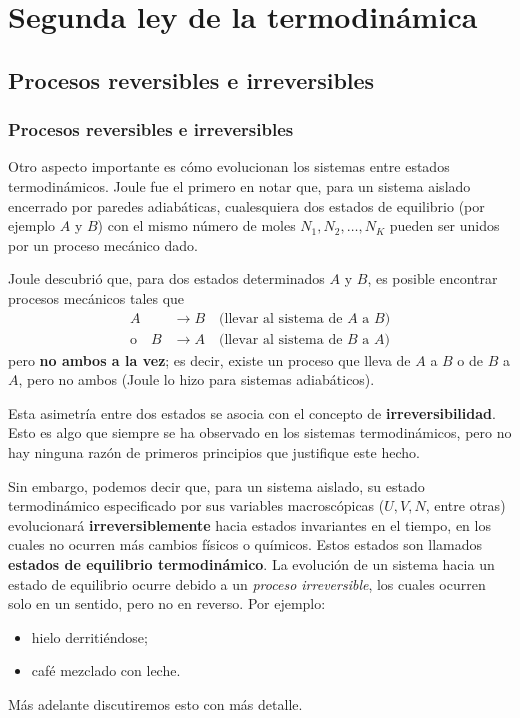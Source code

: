 \chapter{Segunda ley de la termodinámica}

\section{Procesos reversibles e irreversibles}

\subsection*{Procesos reversibles e irreversibles}

Otro aspecto importante es cómo evolucionan los sistemas entre estados termodinámicos. Joule fue
el primero en notar que, para un sistema aislado encerrado por paredes adiabáticas, cualesquiera
dos estados de equilibrio (por ejemplo $A$ y $B$) con el mismo número de moles $N_1,N_2,\dots,N_K$
pueden ser unidos por un proceso mecánico dado.

Joule descubrió que, para dos estados determinados $A$ y $B$, es posible encontrar procesos
mecánicos tales que
\begin{align*}
  A&\to B\quad\text{(llevar al sistema de $A$ a $B$)}\\
  \text{o}\quad B&\to A\quad\text{(llevar al sistema de $B$ a $A$)}
\end{align*}
pero \textbf{no ambos a la vez}; es decir, existe un proceso que lleva de $A$ a $B$ o de $B$ a
$A$, pero no ambos (Joule lo hizo para sistemas adiabáticos).

Esta asimetría entre dos estados se asocia con el concepto de \textbf{irreversibilidad}. Esto es
algo que siempre se ha observado en los sistemas termodinámicos, pero no hay ninguna razón de
primeros principios que justifique este hecho.

Sin embargo, podemos decir que, para un sistema aislado, su estado termodinámico especificado por
sus variables macroscópicas ($U,V,N$, entre otras) evolucionará \textbf{irreversiblemente} hacia
estados invariantes en el tiempo, en los cuales no ocurren más cambios físicos o químicos. Estos
estados son llamados \textbf{estados de equilibrio termodinámico}. La evolución de un sistema
hacia un estado de equilibrio ocurre debido a un \emph{proceso irreversible}, los cuales ocurren
solo en un sentido, pero no en reverso. Por ejemplo:
\begin{itemize}[itemsep=0pt]
  \item hielo derritiéndose;
  \item café mezclado con leche.
\end{itemize}
Más adelante discutiremos esto con más detalle.


